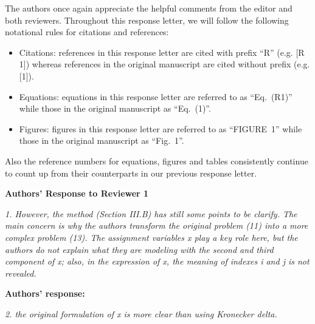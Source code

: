 \documentclass[onecolumn, 11pt, draftclsnofoot]{IEEEtran}
\begin{document}
The authors once again appreciate the helpful comments from the editor and both
reviewers.
Throughout this response letter, we will follow the following notational
rules for citations and references:
\begin{itemize}
  \item Citations: references in this response letter are cited with prefix
  ``R'' (e.g. [R 1]) whereas references in the original manuscript are cited
  without prefix (e.g. [1]).
  \item Equations: equations in this response letter are referred to as
  ``Eq.~(R1)''  while those in the original manuscript as ``Eq.~(1)''.
  \item Figures: figures in this response letter are referred to as
  ``FIGURE~1''  while those in the original manuscript as ``Fig.~1''.
\end{itemize}
Also the reference numbers for equations, figures and tables
consistently continue to count up from their counterparts in our previous
response letter.

\begin{center}
  {\LARGE \textbf{Authors' Response to Reviewer 1}}
\end{center}


 
\noindent
\emph{1. However, the method (Section III.B) has still some points to be
clarify. The main concern is why the authors transform the original problem (11)
into a more complex problem (13). The assignment variables x play a key role
here, but the authors do not explain what they are modeling with the second and
third component of x; also, in the expression of x, the meaning of indexes i and
j is not revealed.}

\noindent \textbf{Authors' response:} 

\vspace{0.5cm}

\noindent
\emph{2. the original formulation of x is more clear than using Kronecker delta.
}
\end{document}
